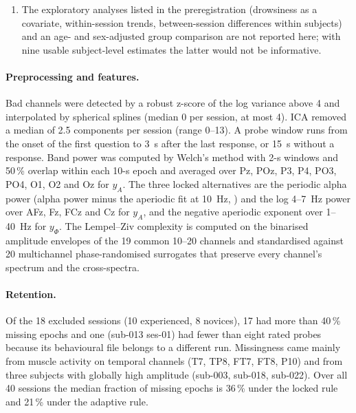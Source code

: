 \documentclass[12pt,a4paper]{article}
\theoremstyle{plain}
\theoremstyle{definition}
\theoremstyle{remark}
\begin{document}
\begin{enumerate}[label=(\roman*)]
  \item The exploratory analyses listed in the preregistration (drowsiness as a covariate, within-session trends, between-session differences within subjects) and an age- and sex-adjusted group comparison are not reported here; with nine usable subject-level estimates the latter would not be informative.
\end{enumerate}

\paragraph{Preprocessing and features.} Bad channels were detected by a robust z-score of the log variance above 4 and interpolated by spherical splines (median 0 per session, at most 4). ICA removed a median of 2.5 components per session (range 0--13). A probe window runs from the onset of the first question to 3~s after the last response, or 15~s without a response. Band power was computed by Welch's method with 2-s windows and 50\,\% overlap within each 10-s epoch and averaged over Pz, POz, P3, P4, PO3, PO4, O1, O2 and Oz for $y_A$. The three locked alternatives are the periodic alpha power (alpha power minus the aperiodic fit at 10~Hz, \citealp{Donoghue2020}) and the log 4--7~Hz power over AFz, Fz, FCz and Cz for $y_A$, and the negative aperiodic exponent over 1--40~Hz for $y_\Phi$. The Lempel--Ziv complexity is computed on the binarised amplitude envelopes of the 19 common 10--20 channels and standardised against 20 multichannel phase-randomised surrogates that preserve every channel's spectrum and the cross-spectra.

\paragraph{Retention.} Of the 18 excluded sessions (10 experienced, 8 novices), 17 had more than 40\,\% missing epochs and one (sub-013 ses-01) had fewer than eight rated probes because its behavioural file belongs to a different run. Missingness came mainly from muscle activity on temporal channels (T7, TP8, FT7, FT8, P10) and from three subjects with globally high amplitude (sub-003, sub-018, sub-022). Over all 40 sessions the median fraction of missing epochs is 36\,\% under the locked rule and 21\,\% under the adaptive rule.
\end{document}
